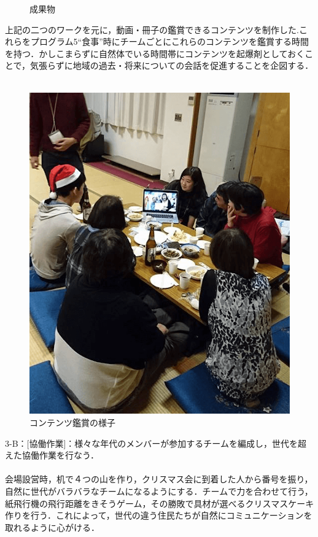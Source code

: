 \documentclass[a4paper]{jsarticle}
\begin{document}
\begin{itemize}
\begin{figure}[H]
\begin{center}
    \caption{成果物}
    \label{fig:tmu_hino}
  \end{center}
\end{figure}
\par
上記の二つのワークを元に，動画・冊子の鑑賞できるコンテンツを制作した.これらをプログラム5“食事”時にチームごとにこれらのコンテンツを鑑賞する時間を持つ．かしこまらずに自然体でいる時間帯にコンテンツを起爆剤としておくことで，気張らずに地域の過去・将来についての会話を促進することを企図する．\\\\
\begin{figure}[H]
  \begin{center}
    \includegraphics[width=0.8\hsize]{./images/09.png}
    \caption{コンテンツ鑑賞の様子}
    \label{fig:tmu_hino}
  \end{center}
\end{figure}

\end{itemize}
3-B：[協働作業]：様々な年代のメンバーが参加するチームを編成し，世代を超えた協働作業を行なう．\\\\
会場設営時，机で４つの山を作り，クリスマス会に到着した人から番号を振り，自然に世代がバラバラなチームになるようにする．チームで力を合わせて行う，紙飛行機の飛行距離をきそうゲーム，その勝敗で具材が選べるクリスマスケーキ作りを行う．これによって，世代の違う住民たちが自然にコミュニケーションを取れるように心がける．\\\\
\end{document}
